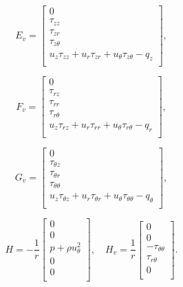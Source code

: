 \begin{equation}
E_v =
\begin{bmatrix}
0 \\
\tau_{zz} \\
\tau_{zr} \\
\tau_{z \theta} \\
u_z \tau_{zz} + u_r \tau_{zr} + u_\theta \tau_{z \theta} - q_z \\
\end{bmatrix}
,
\end{equation}

\begin{equation}
F_v =
\begin{bmatrix}
0 \\
\tau_{rz} \\
\tau_{rr} \\
\tau_{r \theta} \\
u_z \tau_{rz} + u_r \tau_{rr} + u_\theta \tau_{r \theta} - q_r \\
\end{bmatrix}
,
\end{equation}

\begin{equation}
G_v =
\begin{bmatrix}
0 \\
\tau_{\theta z} \\
\tau_{\theta r} \\
\tau_{\theta \theta} \\
u_z \tau_{\theta z} + u_r \tau_{\theta r} + u_\theta \tau_{\theta \theta} - q_\theta \\
\end{bmatrix}
,
\end{equation}

\begin{equation}
H = - \frac{1}{r}
\begin{bmatrix}
0 \\
0 \\
p + \rho u_{\theta}^2\\
0 \\
0 \\
\end{bmatrix}
, \quad
H_v = \frac{1}{r}
\begin{bmatrix}
0 \\
0 \\
- \tau_{\theta \theta} \\
\tau_{r \theta} \\
0 \\
\end{bmatrix}
.
\label{axi_source}
\end{equation}

